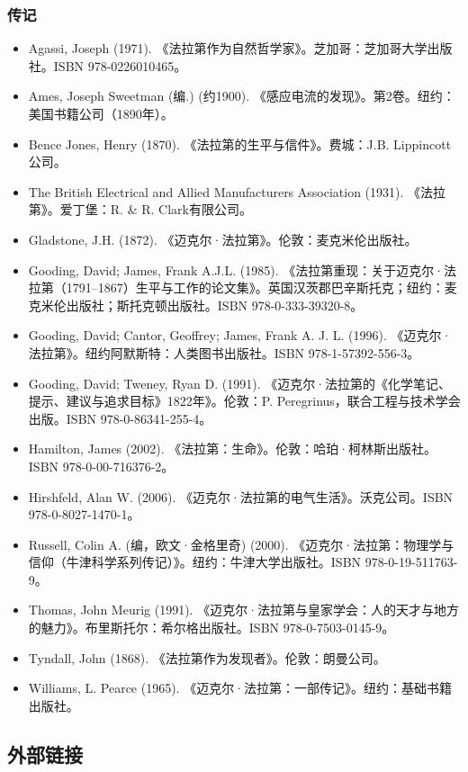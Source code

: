 \subsubsection{传记}
\begin{itemize}
\item Agassi, Joseph (1971). 《法拉第作为自然哲学家》。芝加哥：芝加哥大学出版社。ISBN 978-0226010465。
\item Ames, Joseph Sweetman (编.) (约1900). 《感应电流的发现》。第2卷。纽约：美国书籍公司（1890年）。
\item Bence Jones, Henry (1870). 《法拉第的生平与信件》。费城：J.B. Lippincott公司。
\item The British Electrical and Allied Manufacturers Association (1931). 《法拉第》。爱丁堡：R. & R. Clark有限公司。
\item Gladstone, J.H. (1872). 《迈克尔·法拉第》。伦敦：麦克米伦出版社。
\item Gooding, David; James, Frank A.J.L. (1985). 《法拉第重现：关于迈克尔·法拉第（1791–1867）生平与工作的论文集》。英国汉茨郡巴辛斯托克；纽约：麦克米伦出版社；斯托克顿出版社。ISBN 978-0-333-39320-8。
\item Gooding, David; Cantor, Geoffrey; James, Frank A. J. L. (1996). 《迈克尔·法拉第》。纽约阿默斯特：人类图书出版社。ISBN 978-1-57392-556-3。
\item Gooding, David; Tweney, Ryan D. (1991). 《迈克尔·法拉第的《化学笔记、提示、建议与追求目标》1822年》。伦敦：P. Peregrinus，联合工程与技术学会出版。ISBN 978-0-86341-255-4。
\item Hamilton, James (2002). 《法拉第：生命》。伦敦：哈珀·柯林斯出版社。ISBN 978-0-00-716376-2。
\item Hirshfeld, Alan W. (2006). 《迈克尔·法拉第的电气生活》。沃克公司。ISBN 978-0-8027-1470-1。
\item Russell, Colin A. (编，欧文·金格里奇) (2000). 《迈克尔·法拉第：物理学与信仰（牛津科学系列传记）》。纽约：牛津大学出版社。ISBN 978-0-19-511763-9。
\item Thomas, John Meurig (1991). 《迈克尔·法拉第与皇家学会：人的天才与地方的魅力》。布里斯托尔：希尔格出版社。ISBN 978-0-7503-0145-9。
\item Tyndall, John (1868). 《法拉第作为发现者》。伦敦：朗曼公司。
\item Williams, L. Pearce (1965). 《迈克尔·法拉第：一部传记》。纽约：基础书籍出版社。
\end{itemize}
\subsection{外部链接}
